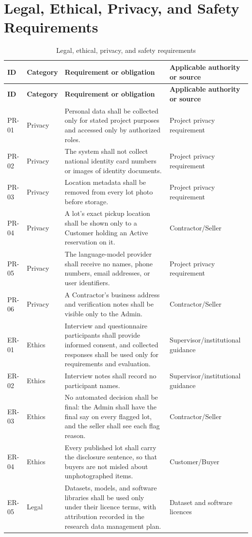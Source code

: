 \section{Legal, Ethical, Privacy, and Safety Requirements }
{\footnotesize
\begin{longtable}{@{}p{}p{}p{}p{}@{}}
\caption{Legal, ethical, privacy, and safety requirements}\label{tab:leps-requirements}\\
\toprule
\textbf{ID} & \textbf{Category} & \textbf{Requirement or obligation} & \textbf{Applicable authority or source} \\
\midrule
\endfirsthead
\toprule
\textbf{ID} & \textbf{Category} & \textbf{Requirement or obligation} & \textbf{Applicable authority or source} \\
\midrule
\endhead
PR-01 & Privacy & Personal data shall be collected only for stated project purposes and accessed only by authorized roles. & Project privacy requirement \\
PR-02 & Privacy & The system shall not collect national identity card numbers or images of identity documents. & Project privacy requirement \\
PR-03 & Privacy & Location metadata shall be removed from every lot photo before storage. & Project privacy requirement \\
PR-04 & Privacy & A lot's exact pickup location shall be shown only to a Customer holding an Active reservation on it. & Contractor/Seller \\
PR-05 & Privacy & The language-model provider shall receive no names, phone numbers, email addresses, or user identifiers. & Project privacy requirement \\
PR-06 & Privacy & A Contractor's business address and verification notes shall be visible only to the Admin. & Contractor/Seller \\
ER-01 & Ethics & Interview and questionnaire participants shall provide informed consent, and collected responses shall be used only for requirements and evaluation. & Supervisor/\allowbreak institutional guidance \\
ER-02 & Ethics & Interview notes shall record no participant names. & Supervisor/\allowbreak institutional guidance \\
ER-03 & Ethics & No automated decision shall be final: the Admin shall have the final say on every flagged lot, and the seller shall see each flag reason. & Contractor/Seller \\
ER-04 & Ethics & Every published lot shall carry the disclosure sentence, so that buyers are not misled about unphotographed items. & Customer/Buyer \\
ER-05 & Legal & Datasets, models, and software libraries shall be used only under their licence terms, with attribution recorded in the research data management plan. & Dataset and software licences \\
\bottomrule
\end{longtable}
}

